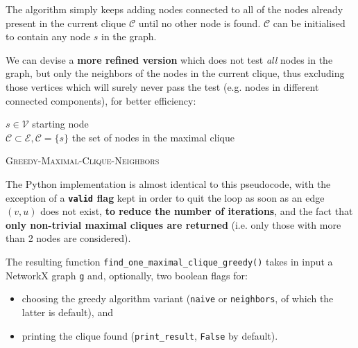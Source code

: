 \documentclass[11pt]{article}
\begin{document}
The algorithm simply keeps adding nodes connected to all of the nodes
already present in the current clique \(\mathcal{C}\) until no other
node is found. \(\mathcal{C}\) can be initialised to contain any node
\(s\) in the graph.

We can devise a \textbf{more refined version} which does not test \textit{all} nodes in the graph, but only the neighbors of the nodes in the current clique, thus excluding those vertices which will surely never pass the test (e.g. nodes in different connected components), for better efficiency:

\begin{algorithm}[h]
\DontPrintSemicolon
\SetAlgoLined

  
  \BlankLine
  \BlankLine
  
  $s \in \mathcal{V}$ starting node
  \\$\mathcal{C} \subset \mathcal{E}, \mathcal{C} = \{s\}$ the set of nodes in the maximal clique
  \BlankLine
  
  
\caption{\textsc{Greedy-Maximal-Clique-Neighbors}}
\end{algorithm}

The Python implementation is almost identical to this pseudocode, with the exception of a \textbf{\texttt{valid} flag} kept in order to quit the loop as soon as an edge $(v, u)$ does not exist, \textbf{to reduce the number of iterations}, and the fact that \textbf{only non-trivial maximal cliques are returned} (i.e. only those with more than 2 nodes are considered).

The resulting function \texttt{find\_one\_maximal\_clique\_greedy()} takes in input a NetworkX graph \texttt{g} and, optionally, two boolean flags for:
\begin{itemize}
     \item choosing the greedy algorithm variant (\texttt{naive} or \texttt{neighbors}, of which the latter is default), and
 \item printing the clique found (\texttt{print\_result}, \texttt{False} by default).
\end{itemize}
\end{document}
